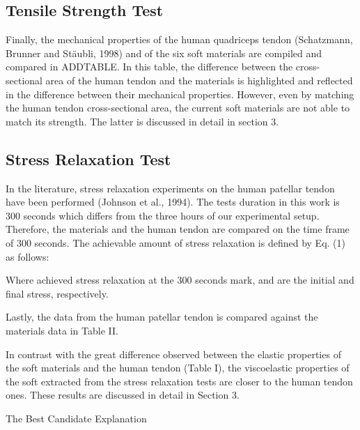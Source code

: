 \subsection{Tensile Strength Test}

Finally, the mechanical properties of the human quadriceps tendon (Schatzmann, Brunner and Stäubli, 1998) and of the six soft materials are compiled and compared in ADDTABLE. In this table, the difference between the cross-sectional area of the human tendon and the materials is highlighted and reflected in the difference between their mechanical properties. However, even by matching the human tendon cross-sectional area, the current soft materials are not able to match its strength. The latter is discussed in detail in section 3.

\subsection{Stress Relaxation Test}

In the literature, stress relaxation experiments on the human patellar tendon have been performed (Johnson et al., 1994). The tests duration in this work is 300 seconds which differs from the three hours of our experimental setup. Therefore, the materials and the human tendon are compared on the time frame of 300 seconds. The achievable amount of stress relaxation is defined by Eq. (1) as follows:

Where achieved stress relaxation at the 300 seconds mark,  and  are the initial and final stress, respectively. 

Lastly, the data from the human patellar tendon is compared against the materials data in Table II.

In contrast with the great difference observed between the elastic properties of the soft materials and the human tendon (Table I), the viscoelastic properties of the soft  extracted from the stress relaxation tests are closer to the human tendon ones. These results are discussed in detail in Section 3.


{\huge The Best Candidate Explanation}

